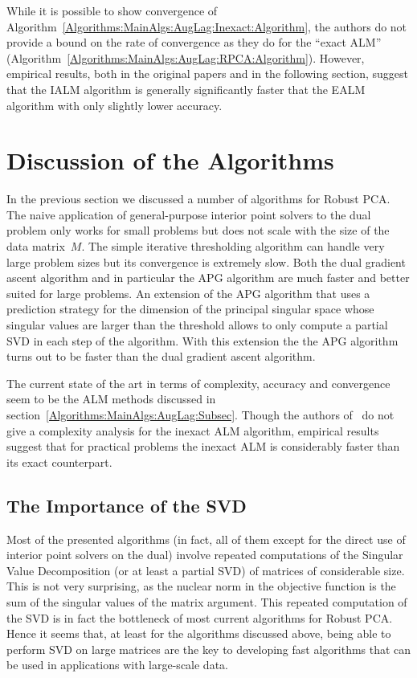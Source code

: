 While it is possible to show convergence of Algorithm~\ref{Algorithms:MainAlgs:AugLag:Inexact:Algorithm}, the authors do not provide a bound on the rate of convergence as they do for the ``exact ALM'' (Algorithm~\ref{Algorithms:MainAlgs:AugLag:RPCA:Algorithm}). However, empirical results, both in the original papers and in the following section, suggest that the IALM algorithm is generally significantly faster that the EALM algorithm with only slightly lower accuracy. 



\section{Discussion of the Algorithms}
\label{Algorithms:Discussion:Sec}

In the previous section we discussed a number of algorithms for Robust PCA. The naive application of general-purpose interior point solvers to the dual problem only works for small problems but does not scale with the size of the data matrix~$M$. The simple iterative thresholding algorithm can handle very large problem sizes but its convergence is extremely slow. Both the dual gradient ascent algorithm and in particular the APG algorithm are much faster and better suited for large problems. An extension of the APG algorithm that uses a prediction strategy for the dimension of the principal singular space whose singular values are larger than the threshold allows to only compute a partial SVD in each step of the algorithm. With this extension the the APG algorithm turns out to be faster than the dual gradient ascent algorithm. 

The current state of the art in terms of complexity, accuracy and convergence seem to be the ALM methods discussed in section~\ref{Algorithms:MainAlgs:AugLag:Subsec}. Though the authors of~\cite{Lin:2010fk} do not give a complexity analysis for the inexact ALM algorithm, empirical results suggest that for practical problems the inexact ALM is considerably faster than its exact counterpart. 





\subsection{The Importance of the SVD}
\label{Algorithms:Discussion:SVD:Subsec}


Most of the presented algorithms (in fact, all of them except for the direct use of interior point solvers on the dual) involve repeated computations of the Singular Value Decomposition (or at least a partial SVD) of matrices of considerable size. This is not very surprising, as the nuclear norm in the objective function is the sum of the singular values of the matrix argument. This repeated computation of the SVD is in fact the bottleneck of most current algorithms for Robust PCA. Hence it seems that, at least for the algorithms discussed above, being able to perform SVD on large matrices are the key to developing fast algorithms that can be used in applications with large-scale data. 


